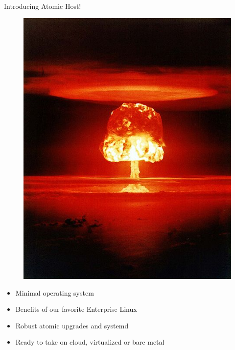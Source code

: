 \documentclass{beamer}
\begin{document}
\begin{frame}{Introducing Atomic Host!}
\begin{figure}[htp]
\centering
\includegraphics[scale=0.45]{atom.jpg}
\label{}
\end{figure}
\begin{itemize}
  \item Minimal operating system
  \item Benefits of our favorite Enterprise Linux
  \item Robust atomic upgrades and systemd 
  \item Ready to take on cloud, virtualized or bare metal
\end{itemize}
\end{frame}
\end{document}
